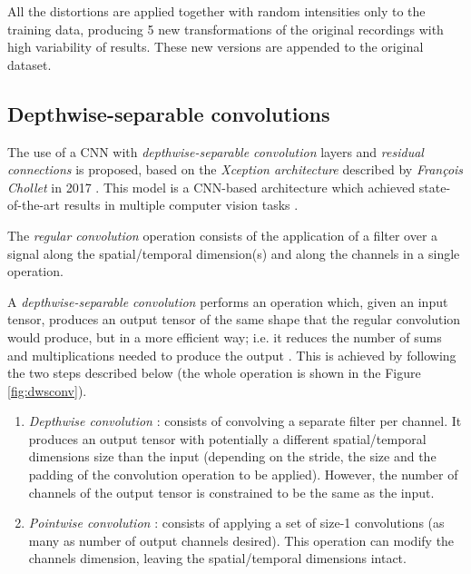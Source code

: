 All the distortions are applied together with random intensities only to the training data, producing 5 new transformations of the original recordings with high variability of results. These new versions are appended to the original dataset.


\subsection{Depthwise-separable convolutions} \label{sec:kwsdwscost}
The use of a CNN with \textit{depthwise-separable convolution} layers and \textit{residual connections} is proposed, based on the \textit{Xception architecture}  described by \textit{François Chollet} in 2017 \autocite{chollet2017}. This model is a CNN-based architecture which achieved state-of-the-art results in multiple computer vision tasks \autocite{liu2019a, Nazar2018, Song2018}.

The \textit{regular convolution} operation consists of the application of a filter over a signal along the spatial/temporal dimension(s) and along the channels in a single operation.

A \textit{depthwise-separable convolution} performs an operation which, given an input tensor, produces an output tensor of the same shape that the regular convolution would produce, but in a more efficient way; i.e. it reduces the number of sums and multiplications needed to produce the output \autocite{chollet2017}. This is achieved by following the two steps described below (the whole operation is shown in the Figure \ref{fig:dwsconv}).



\begin{enumerate}
	\item \textit{Depthwise convolution} \autocite{Yunhui2019}: consists of convolving a separate filter per channel. It produces an output tensor with potentially a different spatial/temporal dimensions size than the input (depending on the stride, the size and the padding of the convolution operation to be applied). However, the number of channels of the output tensor is constrained to be the same as the input.
	\item \textit{Pointwise convolution} \autocite{Gao2018}: consists of applying a set of size-1 convolutions (as many as number of output channels desired). This operation can modify the channels dimension, leaving the spatial/temporal dimensions intact.
\end{enumerate}


